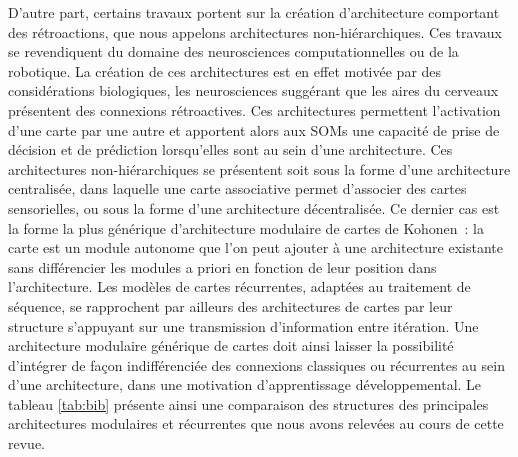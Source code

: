 \documentclass[../main]{subfiles}
\begin{document}
D'autre part, certains travaux portent sur la création d'architecture comportant des rétroactions, que nous appelons architectures non-hiérarchiques. 
Ces travaux se revendiquent du domaine des neurosciences computationnelles ou de la robotique. La création de ces architectures est en effet motivée par des considérations biologiques, les neurosciences suggérant que les aires du cerveaux présentent des connexions rétroactives. 
Ces architectures permettent l'activation d'une carte par une autre et apportent alors aux SOMs une capacité de prise de décision et de prédiction lorsqu'elles sont au sein d'une architecture. Ces architectures non-hiérarchiques se présentent soit sous la forme d'une architecture centralisée, dans laquelle une carte associative permet d'associer des cartes sensorielles, ou sous la forme d'une architecture décentralisée. 
Ce dernier cas est la forme la plus générique d'architecture modulaire de cartes de Kohonen~: la carte est un module autonome que l'on peut ajouter à une architecture existante sans différencier les modules a priori en fonction de leur position dans l'architecture.
Les modèles de cartes récurrentes, adaptées au traitement de séquence, se rapprochent par ailleurs des architectures de cartes par leur structure s'appuyant sur une transmission d'information entre itération.
Une architecture modulaire générique de cartes doit ainsi laisser la possibilité d'intégrer de façon indifférenciée des connexions classiques ou récurrentes au sein d'une architecture, dans une motivation d'apprentissage développemental.
Le tableau \ref{tab:bib} présente ainsi une comparaison des structures des principales architectures modulaires et récurrentes que nous avons relevées au cours de cette revue. 
\end{document}
